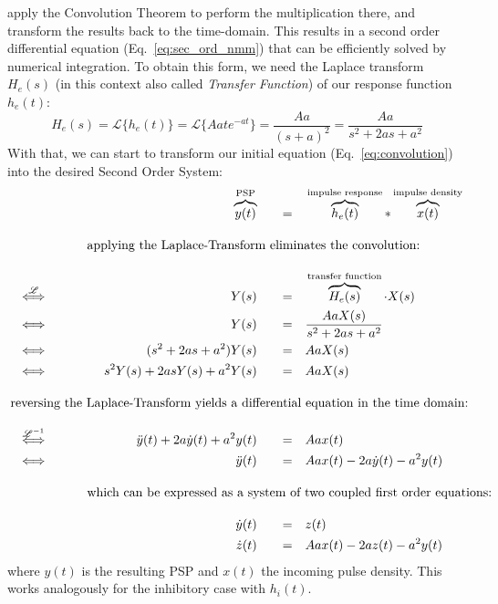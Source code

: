 apply the Convolution Theorem to perform the multiplication there,
and transform the results back to the time-domain.
This results in a second order differential equation (Eq.~\ref{eq:sec_ord_nmm}) that
can be efficiently solved by numerical integration.
To obtain this form, we need the Laplace transform $H_e(s)$ (in this context also called \textit{Transfer Function})
of our response function $h_e(t)$:
\[H_e(s) =\mathscr{L}\{h_e(t)\}  = \mathscr{L}\{Aate^{-at} \} = \frac{Aa}{(s+a)^2} = \frac{Aa}{s^2+2as+a^2}\label{eq:laplace_h_e}\]
With that, we can start to transform our initial equation (Eq.~\ref{eq:convolution}) into the desired Second Order System:
\begin{alignat}{5}
    &                                           & &&          \overbrace{y(t)}^{\text{PSP}} \quad &&=& \quad \overbrace{h_e(t)}^{\text{impulse response}} \ast \overbrace{x(t)}^{\text{impulse density}} \nonumber \\[1em]
    &                                           & \omit\rlap{applying the Laplace-Transform eliminates the convolution:}                 \nonumber \\[1em]
    &  \stackrel{\mathscr{L}}{\iff} \qquad      & &&                             Y(s) \quad &&=& \quad \overbrace{H_e(s)}^{\text{transfer function}} \cdot X(s)  \label{eq:laplace_domain} \\
    &  \iff                                     & &&                             Y(s) \quad &&=& \quad \frac{AaX(s)}{s^2+2as+a^2}  \nonumber \\
    &  \iff                                     & &&               (s^2+2as+a^2) Y(s) \quad &&=& \quad AaX(s) \nonumber \\
    &  \iff                                     & &&          s^{2}Y(s)+2asY(s)+a^{2}Y(s) \quad &&=& \quad AaX(s) \nonumber \\[1em]
    \omit\rlap{reversing the Laplace-Transform yields a differential equation in the time domain:}     \nonumber \\[1em]
    &  \stackrel{\mathscr{L}^{-1}}{\iff} \qquad & && \ddot{y}(t)+2a\dot{y}(t)+a^{2}y(t) \quad &&=& \quad Aax(t) \nonumber \\
    &  \iff                                     & &&                      \ddot{y}(t) \quad &&=& \quad Aax(t)-2a\dot{y}(t)-a^{2}y(t)  \label{eq:sec_ord_nmm} \\[1em]
    &                                           & \omit\rlap{which can be expressed as a system of two coupled first order equations:}                 \nonumber \\[1em]
    &                                           & &&                       \dot{y}(t) \quad &&=& \quad z(t)  \label{eq:y_t}\\
    &                                           & &&                       \dot{z}(t) \quad &&=& \quad Aax(t)-2az(t)-a^{2}y(t)   \label{eq:z_t}
\end{alignat}
where $y(t)$ is the resulting PSP and $x(t)$ the incoming pulse density.
This works analogously for the inhibitory case with $h_i(t)$.

